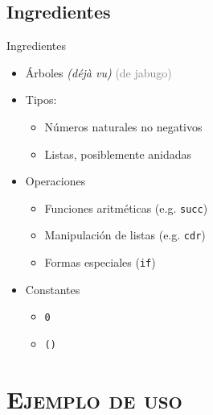 \documentclass[xcolor=x11names,compress]{beamer}
\renewcommand{\(}{\begin{columns}}
\renewcommand{\)}{\end{columns}}
\newcommand{\<}[1]{\begin{column}{#1}}
\renewcommand{\>}{\end{column}}
\begin{document}
\subsection{Ingredientes}
\begin{frame}{Ingredientes}
    \begin{itemize}
        \item Árboles \pause \emph{(déjà vu)} \pause \textcolor{gray}{\scriptsize(de jabugo)} \pause
        \item Tipos: \pause
            \begin{itemize}
            \item Números naturales no negativos \pause
            \item Listas, posiblemente anidadas
            \end{itemize}
        \item Operaciones
            \begin{itemize}
                \item Funciones aritméticas (e.g. \texttt{succ})
                \item Manipulación de listas (e.g. \texttt{cdr})
                \item Formas especiales (\texttt{if})
            \end{itemize}
        \item Constantes
            \begin{itemize}
                \item \texttt{0}
                \item \texttt{()}
            \end{itemize}
    \end{itemize}
\end{frame}

\section{\scshape Ejemplo de uso}
\end{document}
